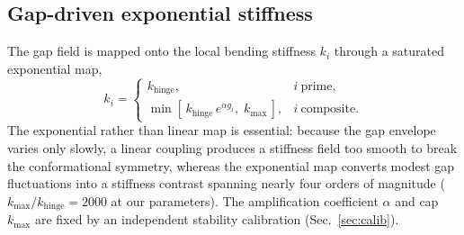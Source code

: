 \documentclass[11pt]{article}
\begin{document}
\subsection{Gap-driven exponential stiffness}
The gap field is mapped onto the local bending stiffness $k_i$ through a saturated
exponential map,
\begin{equation}
k_i =
\begin{cases}
k_{\text{hinge}}, & i \ \text{prime},\\[3pt]
\min\!\left[\, k_{\text{hinge}}\, e^{\alpha g_i},\; k_{\max}\,\right], & i \ \text{composite}.
\end{cases}
\end{equation}
The exponential rather than linear map is essential: because the gap envelope varies
only slowly, a linear coupling produces a stiffness field too smooth to break the
conformational symmetry, whereas the exponential map converts modest gap fluctuations
into a stiffness contrast spanning nearly four orders of magnitude
($k_{\max}/k_{\text{hinge}} = 2000$ at our parameters). The amplification coefficient
$\alpha$ and cap $k_{\max}$ are fixed by an independent stability calibration
(Sec.~\ref{sec:calib}).
\end{document}
